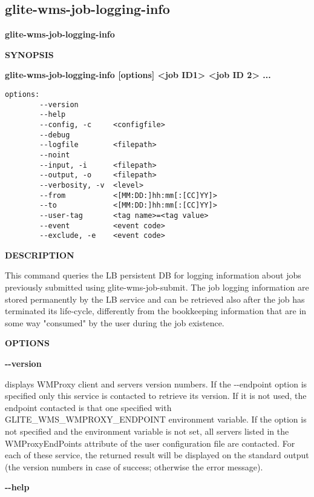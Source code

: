 
\subsection{glite-wms-job-logging-info}
\label{glite-wms-job-logging-info}

\medskip
\textbf{glite-wms-job-logging-info}
\smallskip


\textbf{SYNOPSIS}
\smallskip

\textbf{glite-wms-job-logging-info [options] <job ID1> <job ID 2> ...}

\begin{verbatim}
options:
        --version
        --help
        --config, -c     <configfile>
        --debug
        --logfile        <filepath>
        --noint
        --input, -i      <filepath>
        --output, -o     <filepath>
        --verbosity, -v  <level>
        --from           <[MM:DD:]hh:mm[:[CC]YY]>
        --to             <[MM:DD:]hh:mm[:[CC]YY]>
        --user-tag       <tag name>=<tag value>
        --event          <event code>
        --exclude, -e    <event code>
\end{verbatim}

\medskip
\textbf{DESCRIPTION}
\smallskip

This command queries the LB persistent DB for logging information about jobs previously submitted using 
glite-wms-job-submit.
The job logging information are stored permanently by the LB service and can be retrieved also after 
the job has terminated its life-cycle, differently from the bookkeeping information that are in some way 
"consumed" by the user during the job existence.


\medskip\textbf{OPTIONS}\smallskip



\textbf{-{}-version}

displays WMProxy client and servers version numbers.
If the -{}-endpoint option is specified only this service is contacted to retrieve its version. If it is not used, the endpoint contacted is that one specified with GLITE\_WMS\_WMPROXY\_ENDPOINT environment variable. If the option is not specified and the environment variable is not set, all servers listed in the WMProxyEndPoints attribute of the user configuration file are contacted. For each of these service, the returned result will be displayed on the standard output (the version numbers in case of success; otherwise the error message).




\textbf{-{}-help}

